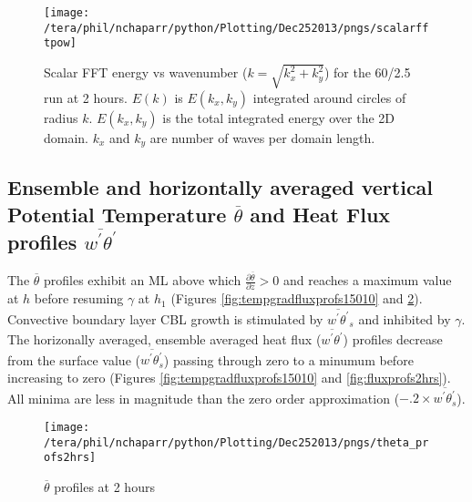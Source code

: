 \begin{figure}[htbp]
    \centering
    \texttt{[image: /tera/phil/nchaparr/python/Plotting/Dec252013/pngs/scalarfftpow]}
    \caption{Scalar FFT  energy vs wavenumber ($k = \sqrt{k_{x}^{2}+k_{y}^{2}}$) for the 60/2.5 run
at 2 hours.  $E(k)$ is $E(k_{x}, k_{y})$ integrated around circles of radius $k$.  
   $E(k_{x}, k_{y})$ is the total integrated energy over the 2D domain.  
   $k_{x}$ and $k_{y}$ are number of waves per domain length.}
    \label{fig:2fftw602point5}   %
\end{figure}

\clearpage

\subsection{Ensemble and horizontally averaged vertical Potential Temperature $\overline{\theta}$ 
and Heat Flux profiles $\overline{w^{'}\theta^{'}}$}
\FloatBarrier

The $\overline{\theta}$ profiles exhibit an \acs{ML} above which  $\frac{\partial\overline{\theta}}{\partial z}>0$ 
and reaches a maximum value at $h$ before resuming $\gamma$  at $h_{1}$ 
(Figures \ref{fig:tempgradfluxprofs15010} and \ref{fig:pottempprofs2hrs}).  Convective boundary layer \acs{CBL} growth is stimulated 
by $\overline{w^{'}\theta^{'}}_{s}$ and inhibited by $\gamma$.\\

The horizonally averaged, ensemble averaged heat flux ($\overline{w^{'}\theta^{'}}$) profiles decrease 
from the surface value ($\overline{w^{'}\theta^{'}_{s}}$) passing through zero to a minumum before 
increasing to zero (Figures \ref{fig:tempgradfluxprofs15010} and  \ref{fig:fluxprofs2hrs}).  All minima are 
less  in magnitude than the zero order approximation ($-.2 \times \overline{w^{'}\theta^{'}_{s}}$).\\


\begin{figure}[htbp]
    \centering
    \texttt{[image: /tera/phil/nchaparr/python/Plotting/Dec252013/pngs/theta\_profs2hrs]}
    \caption{$\overline{\theta}$ profiles at 2 hours}
    \label{fig:pottempprofs2hrs}   %
\end{figure}


